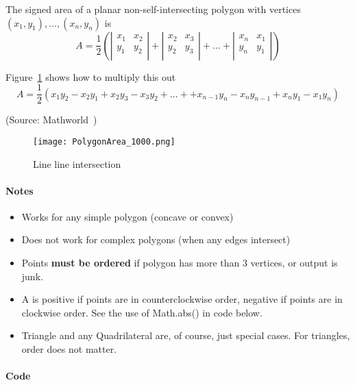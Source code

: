 The signed area of a planar non-self-intersecting polygon with vertices $(x_1, y_1), \dots, (x_n, y_n)$ is
\[
    A = \frac{1}{2} \left(
        \left\vert
        \begin{array}{cc}
            x_1 & x_2 \\
            y_1 & y_2 \\
        \end{array}
        \right\vert
        +
        \left\vert
        \begin{array}{cc}
            x_2 & x_3 \\
            y_2 & y_3 \\
        \end{array}
        \right\vert
        + \ldots +
        \left\vert
        \begin{array}{cc}
            x_n & x_1 \\
            y_n & y_1 \\
        \end{array}
        \right\vert
        \right)
\]

Figure~\ref{fig:polygonareadeterminant} shows how to multiply this out
\[
    A = \frac{1}{2} \left(
        x_1 y_2 - x_2 y_1
      + x_2 y_3 - x_3 y_2
      + \ldots +
      + x_{n-1} y_n - x_n y_{n-1}
      + x_{n} y_1 - x_1 y_n
      \right)
\]

(Source: Mathworld~\cite{mathworldpolygonarea})

\begin{figure}
    \centering
    \texttt{[image: PolygonArea\_1000.png]}
    \caption{Line line intersection}
    \label{fig:polygonareadeterminant}
\end{figure}

\paragraph{Notes}
\begin{itemize}
\item Works for any simple polygon (concave or convex)
\item Does not work for complex polygons (when any edges intersect)
\item Points \textbf{must be ordered} if polygon has more than 3 vertices, or output is junk.
\item A is positive if points are in counterclockwise order, negative if points are in clockwise order.
    See the use of Math.abs() in code below.
\item Triangle and any Quadrilateral are, of course, just special cases.
    For triangles, order does not matter.
\end{itemize}

\paragraph{Code}
\inputminted[fontsize=\footnotesize,linenos=true]{java}{code/polygonarea.java}

